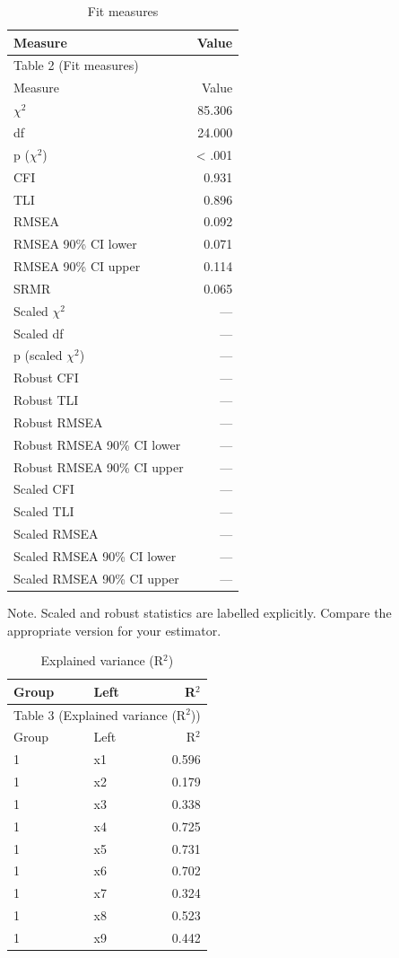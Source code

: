 \documentclass[11pt]{article}
\begin{document}
\small
\begin{longtable}{lr}
\caption{Fit measures}\\
\toprule
Measure & Value \\
\midrule
\endfirsthead
\multicolumn{2}{l}{Table 2 (Fit measures)} \\
\toprule
Measure & Value \\
\midrule
\endhead
$\chi$$^{2}$ & 85.306 \\
df & 24.000 \\
p ($\chi$$^{2}$) & < .001 \\
CFI & 0.931 \\
TLI & 0.896 \\
RMSEA & 0.092 \\
RMSEA 90\% CI lower & 0.071 \\
RMSEA 90\% CI upper & 0.114 \\
SRMR & 0.065 \\
Scaled $\chi$$^{2}$ & — \\
Scaled df & — \\
p (scaled $\chi$$^{2}$) & — \\
Robust CFI & — \\
Robust TLI & — \\
Robust RMSEA & — \\
Robust RMSEA 90\% CI lower & — \\
Robust RMSEA 90\% CI upper & — \\
Scaled CFI & — \\
Scaled TLI & — \\
Scaled RMSEA & — \\
Scaled RMSEA 90\% CI lower & — \\
Scaled RMSEA 90\% CI upper & — \\
\bottomrule
\end{longtable}
\noindent Note. Scaled and robust statistics are labelled explicitly. Compare the appropriate version for your estimator.\par

\small
\begin{longtable}{llr}
\caption{Explained variance (R$^{2}$)}\\
\toprule
Group & Left & R$^{2}$ \\
\midrule
\endfirsthead
\multicolumn{3}{l}{Table 3 (Explained variance (R$^{2}$))} \\
\toprule
Group & Left & R$^{2}$ \\
\midrule
\endhead
1 & x1 & 0.596 \\
1 & x2 & 0.179 \\
1 & x3 & 0.338 \\
1 & x4 & 0.725 \\
1 & x5 & 0.731 \\
1 & x6 & 0.702 \\
1 & x7 & 0.324 \\
1 & x8 & 0.523 \\
1 & x9 & 0.442 \\
\bottomrule
\end{longtable}
\end{document}

